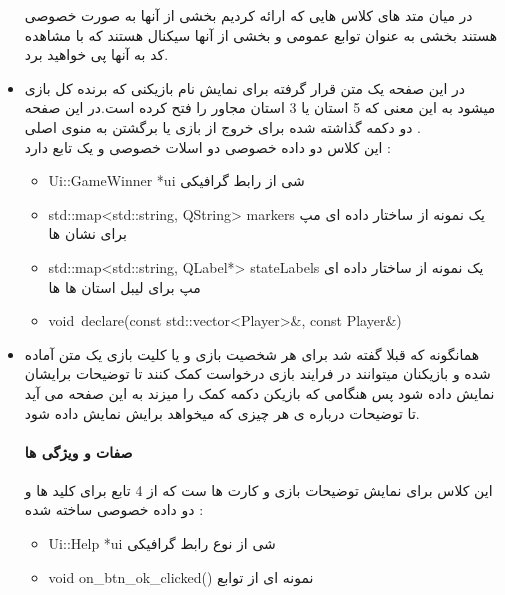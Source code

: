 \documentclass[pdf,titlepage,a4paper]{report}
\begin{document}
\begin{itemize}
\begin{latin}
\begin{itemize}
			\end{itemize}

			 در میان متد های کلاس هایی که ارائه کردیم بخشی از آنها به صورت خصوصی هستند بخشی به عنوان توابع عمومی و بخشی از آنها سیکنال هستند که با مشاهده کد به آنها پی خواهید برد.\\
		\end{latin}
		
		\item {}  در این صفحه یک متن قرار گرفته برای نمایش نام بازیکنی که برنده کل بازی میشود به این معنی که 5 استان یا 3 استان مجاور را فتح کرده است.در این صفحه دو دکمه گذاشته شده برای خروج از بازی یا برگشتن به منوی اصلی .\\
		  این کلاس دو داده خصوصی دو اسلات خصوصی و یک تابع دارد :
		\begin{latin}
			\begin{itemize}
				\item Ui::GameWinner *ui  شی از رابط گرافیکی
				\item std::map<std::string, QString> markers  یک نمونه از ساختار داده ای مپ برای نشان ها
				\item std::map<std::string, QLabel*> stateLabels یک نمونه از ساختار داده ای مپ برای لیبل استان ها ها
				\item void\ declare(const std::vector<Player>&, const Player&)
			\end{itemize}
		\end{latin}

		\item {}  همانگونه که قبلا گفته شد برای هر شخصیت بازی و یا کلیت بازی یک متن آماده شده و بازیکنان میتوانند در فرایند بازی درخواست کمک کنند تا توضیحات برایشان نمایش داده شود پس هنگامی که بازیکن دکمه کمک را میزند به این صفحه می آید تا توضیحات درباره ی هر چیزی که میخواهد برایش نمایش داده شود.\\
		\paragraph{صفات و ویژگی ها} 
         این کلاس برای نمایش توضیحات بازی و کارت ها ست که از 4 تابع برای کلید ها و دو داده خصوصی ساخته شده :
		\begin{latin}
			\begin{itemize}
				\item Ui::Help *ui شی از  نوع رابط گرافیکی 
				\item void on_btn_ok_clicked() نمونه ای از توابع 
			\end{itemize} 
		\end{latin} 	
		

\end{itemize}
\end{document}
